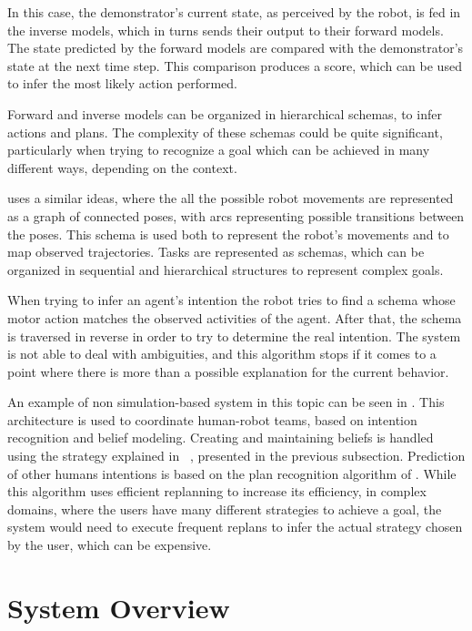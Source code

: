 In this case, the demonstrator's current state, as perceived by the robot, is fed in the inverse models, which in turns sends their output to their forward models. The state predicted by the forward models are compared with the demonstrator's state at the next time step. This comparison produces a score, which can be used to infer the most likely action performed. 

Forward and inverse models can be organized in hierarchical schemas, to infer actions and plans. The complexity of these schemas could be quite significant, particularly when trying to recognize a goal which can be achieved in many different ways, depending on the context. 

\cite{BreazealGB09} uses a similar ideas, where the all the possible robot movements are represented as a graph of connected poses, with arcs representing possible transitions between the poses. This schema is used both to represent the robot's movements and to map observed trajectories. Tasks are represented as schemas, which can be organized in sequential and hierarchical structures to represent complex goals.

 When trying to infer an agent's intention the robot tries to find a schema whose motor action matches the observed activities of the agent. After that, the schema is traversed in reverse in order to try to determine the real intention. The system is not able to deal with ambiguities, and this algorithm stops if it comes to a point where there is more than a possible explanation for the current behavior. 

An example of non simulation-based system in this topic can be seen in \cite{talamadupula2014coordination}. This architecture is used to coordinate human-robot teams, based on intention recognition and belief modeling. Creating and maintaining beliefs is handled using the strategy explained in ~\cite{scheutz2013computational}, presented in the previous subsection. Prediction of other humans intentions is based on the plan recognition algorithm of \cite{ramirez2009plan}. While this algorithm uses efficient replanning to increase its efficiency, in complex domains, where the users have many different strategies to achieve a goal, the system would need to execute frequent replans to infer the actual strategy chosen by the user, which can be expensive.

\section{System Overview}
\label{sec:situation_assessment-overview}

